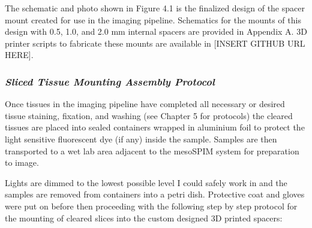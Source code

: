 The schematic and photo shown in Figure 4.1 is the finalized design of the spacer mount created for use in the imaging pipeline. Schematics for the mounts of this design with 0.5, 1.0, and 2.0 mm internal spacers are provided in Appendix A. 3D printer scripts to fabricate these mounts are available in [INSERT GITHUB URL HERE].

\subsubsection{\textit{Sliced Tissue Mounting Assembly Protocol}}

Once tissues in the imaging pipeline have completed all necessary or desired tissue staining, fixation, and washing (see Chapter 5 for protocols) the cleared tissues are placed into sealed containers wrapped in aluminium foil to protect the light sensitive fluorescent dye (if any) inside the sample.  Samples are then transported to a wet lab area adjacent to the mesoSPIM system for preparation to image. 

Lights are dimmed to the lowest possible level I could safely work in and the samples are removed from containers into a petri dish. Protective coat and gloves were put on before then proceeding with the following step by step protocol for the mounting of cleared slices into the custom designed 3D printed spacers:

